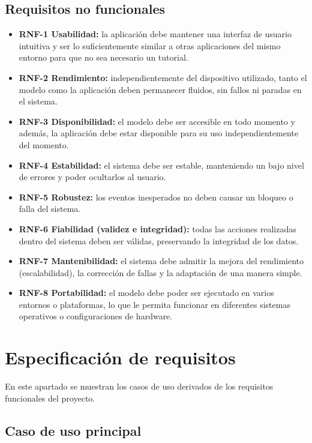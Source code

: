 \subsection{Requisitos no funcionales}

\begin{itemize}
    \item \textbf{RNF-1 Usabilidad:} la aplicación debe mantener una interfaz de usuario intuitiva y ser lo suficientemente similar a otras aplicaciones del mismo entorno para que no sea necesario un tutorial.
    \item \textbf{RNF-2 Rendimiento:} independientemente del dispositivo utilizado, tanto el modelo como la aplicación deben permanecer fluidos, sin fallos ni paradas en el sistema.
    \item \textbf{RNF-3 Disponibilidad:} el modelo debe ser accesible en todo momento y además, la aplicación debe estar disponible para su uso independientemente del momento.
    \item \textbf{RNF-4 Estabilidad:} el sistema debe ser estable, manteniendo un bajo nivel de errores y poder ocultarlos al usuario.
    \item \textbf{RNF-5 Robustez:} los eventos inesperados no deben causar un bloqueo o falla del sistema.
    \item \textbf{RNF-6 Fiabilidad (validez e integridad):} todas las acciones realizadas dentro del sistema deben ser válidas, preservando la integridad de los datos.
    \item \textbf{RNF-7 Mantenibilidad:} el sistema debe admitir la mejora del rendimiento (escalabilidad), la corrección de fallas y la adaptación de una manera simple.
    \item \textbf{RNF-8 Portabilidad:} el modelo debe poder ser ejecutado en varios entornos o plataformas, lo que le permita funcionar en diferentes sistemas operativos o configuraciones de hardware.
\end{itemize}



\section{Especificación de requisitos}

En este apartado se muestran los casos de uso derivados de los requisitos funcionales del proyecto.

\subsection{Caso de uso principal}

